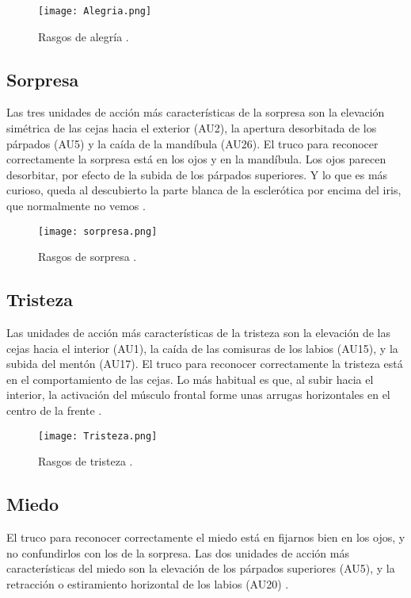 \begin{figure}[h]
    \centering
    \texttt{[image: Alegria.png]}
    \caption{Rasgos de alegría \cite{ReconocerLasEmociones}.}
    \label{fig:Alegria}
\end{figure}

\subsection*{Sorpresa}
Las tres unidades de acción más características de la sorpresa son la elevación simétrica de las cejas hacia el exterior (AU2), la apertura desorbitada de los párpados (AU5) y la caída de la mandíbula (AU26). El truco para reconocer correctamente la sorpresa está en los ojos y en la mandíbula. Los ojos parecen desorbitar, por efecto de la subida de los párpados superiores. Y lo que es más curioso, queda al descubierto la parte blanca de la esclerótica por encima del iris, que normalmente no vemos \cite{ReconocerLasEmociones}.

\begin{figure}[h]
    \centering
    \texttt{[image: sorpresa.png]}
    \caption{Rasgos de sorpresa \cite{ReconocerLasEmociones}.}
    \label{fig:Sorpresa}
\end{figure}

\subsection*{Tristeza}
Las unidades de acción más características de la tristeza son la elevación de las cejas hacia el interior (AU1), la caída de las comisuras de los labios (AU15), y la subida del mentón (AU17). El truco para reconocer correctamente la tristeza está en el comportamiento de las cejas. Lo más habitual es que, al subir hacia el interior, la activación del músculo frontal forme unas arrugas horizontales en el centro de la frente \cite{ReconocerLasEmociones}.

\begin{figure}[h]
    \centering
    \texttt{[image: Tristeza.png]}
    \caption{Rasgos de tristeza \cite{ReconocerLasEmociones}.}
    \label{fig:Tristeza}
\end{figure}

\subsection*{Miedo}
El truco para reconocer correctamente el miedo está en fijarnos bien en los ojos, y no confundirlos con los de la sorpresa. Las dos unidades de acción más características del miedo son la elevación de los párpados superiores (AU5), y la retracción o estiramiento horizontal de los labios (AU20) \cite{ReconocerLasEmociones}.

